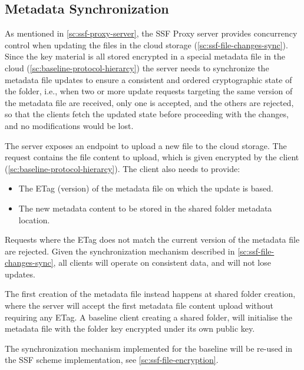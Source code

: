 \subsection{Metadata Synchronization}\label{sc:metadata-synchronization}

As mentioned in \cref{sc:ssf-proxy-server}, the
SSF Proxy server provides concurrency control
when updating the files in the cloud storage (\cref{sc:ssf-file-changes-sync}).
Since the key material is all stored encrypted in a special metadata file
in the cloud (\cref{sc:baseline-protocol-hierarcy})
the server needs to synchronize the metadata file updates
to ensure a consistent and ordered cryptographic state of the folder,
i.e., when two or more update requests targeting the same version
of the metadata file are received, only one is
accepted, and the others are rejected, so that the
clients fetch the updated state before proceeding
with the changes, and no modifications would be lost.

The server exposes an endpoint to upload a new file
to the cloud storage. The request contains the file
content to upload, which is given encrypted by the client
(\cref{sc:baseline-protocol-hierarcy}). The client
also needs to provide:
\begin{itemize}
    \item The ETag (version) of the metadata file on which the update is based.
    \item The new metadata content to be stored in the shared folder metadata location.
\end{itemize}
Requests where the ETag does not match the current version
of the metadata file are rejected. Given the
synchronization mechanism described in \cref{sc:ssf-file-changes-sync},
all clients will operate on consistent data, and
will not lose updates.

The first creation of the metadata file instead happens
at shared folder creation, where the server will
accept the first metadata file content upload
without requiring any ETag. A baseline client
creating a shared folder, will initialise the metadata
file with the folder key encrypted under its own
public key.

The synchronization mechanism implemented
for the baseline will be re-used in the SSF scheme
implementation, see \cref{sc:ssf-file-encryption}.
